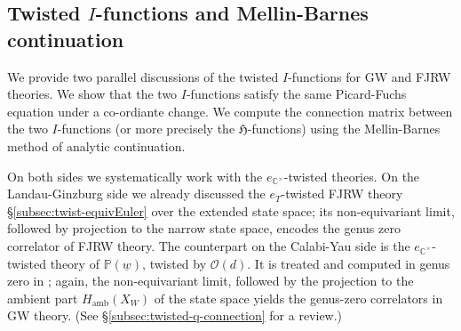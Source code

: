 \documentclass[11pt]{amsart}
\theoremstyle{definition} %
\theoremstyle{remark} %
\newcommand{\CC}{\mathbb C}
\newcommand{\PP}{\mathbb P}
\newcommand{\Ocal}{\mathcal O}
\newcommand{\cO}{\mathcal{O}}
\newcommand{\amb}{\operatorname{amb}}
\newcommand{\Hf}{{\mathfrak{H}}}
\newcommand{\uw}{\underline{w}}
\begin{document}

\subsection{Twisted $I$-functions and 
Mellin-Barnes continuation} 
\label{subsect:Ifunct-and-MB}
We provide two parallel discussions of 
the twisted $I$-functions for GW and FJRW theories. 
We show that the two $I$-functions satisfy 
the same Picard-Fuchs equation under a co-ordiante change. 
We compute the connection matrix between the two $I$-functions 
(or more precisely the $\Hf$-functions) 
using the Mellin-Barnes method of analytic continuation. 

On both sides we systematically work 
with the $e_{\CC^\times}$-twisted theories. 
On the Landau-Ginzburg side we already discussed 
the $e_{T}$-twisted FJRW theory \S\ref{subsec:twist-equivEuler}
over the extended state space; 
its non-equivariant limit, followed by 
projection to the narrow state space, 
encodes the genus zero correlator of FJRW theory. 
The counterpart on the Calabi-Yau side 
is the $e_{\CC^\times}$-twisted theory of 
$\PP(\uw)$, twisted by $\cO(d)$. 
It is treated and computed in genus zero in \cite{CCLT};
again, the non-equivariant limit, followed 
by the projection to the ambient part $H_{\amb}(X_W)$ of 
the state space yields the genus-zero 
correlators in GW theory.  
(See \S \ref{subsec:twisted-q-connection} 
for a review.)
\end{document}
